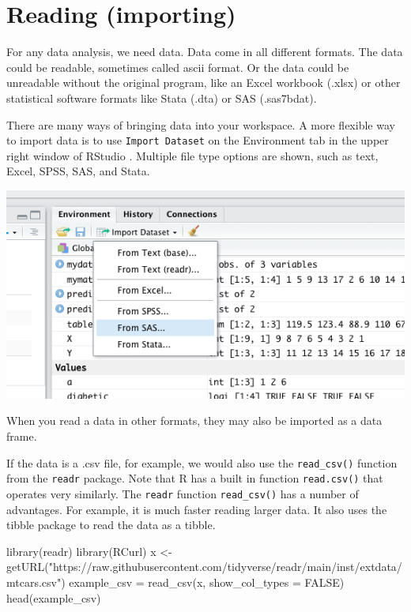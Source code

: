 \documentclass[
]{book}
\newenvironment{Shaded}{\begin{snugshade}}{\end{snugshade}}
\newcommand{\AttributeTok}[1]{\textcolor[rgb]{0.77,0.63,0.00}{#1}}
\newcommand{\ConstantTok}[1]{\textcolor[rgb]{0.00,0.00,0.00}{#1}}
\newcommand{\FunctionTok}[1]{\textcolor[rgb]{0.00,0.00,0.00}{#1}}
\newcommand{\NormalTok}[1]{#1}
\newcommand{\OtherTok}[1]{\textcolor[rgb]{0.56,0.35,0.01}{#1}}
\newcommand{\StringTok}[1]{\textcolor[rgb]{0.31,0.60,0.02}{#1}}
\begin{document}
\hypertarget{reading-importing}{%
\section{Reading (importing)}\label{reading-importing}}

For any data analysis, we need data. Data come in all different formats. The data could be readable, sometimes called ascii format. Or the data could be unreadable without the original program, like an Excel workbook (.xlsx) or other statistical software formats like Stata (.dta) or SAS (.sas7bdat).

There are many ways of bringing data into your workspace. A more flexible way to import data is to use \texttt{Import\ Dataset} on the Environment tab in the upper right window of RStudio . Multiple file type options are shown, such as text, Excel, SPSS, SAS, and Stata.

\includegraphics[width=7.67in]{png/Import}

When you read a data in other formats, they may also be imported as a data frame.

If the data is a .csv file, for example, we would also use the \texttt{read\_csv()} function from the \texttt{readr} package. Note that R has a built in function \texttt{read.csv()} that operates very similarly. The \texttt{readr} function \texttt{read\_csv()} has a number of advantages. For example, it is much faster reading larger data. It also uses the tibble package to read the data as a tibble.

\begin{Shaded}
\begin{Highlighting}[]
\FunctionTok{library}\NormalTok{(readr)}
\FunctionTok{library}\NormalTok{(RCurl)}
\NormalTok{x }\OtherTok{\textless{}{-}} \FunctionTok{getURL}\NormalTok{(}\StringTok{"https://raw.githubusercontent.com/tidyverse/readr/main/inst/extdata/mtcars.csv"}\NormalTok{)}
\NormalTok{example\_csv }\OtherTok{=} \FunctionTok{read\_csv}\NormalTok{(x, }\AttributeTok{show\_col\_types =} \ConstantTok{FALSE}\NormalTok{)}
\FunctionTok{head}\NormalTok{(example\_csv)}
\end{Highlighting}
\end{Shaded}
\end{document}
